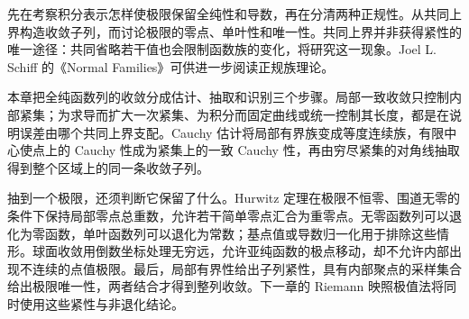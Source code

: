 \ProseParagraphBreak

先在考察积分表示怎样使极限保留全纯性和导数，再在分清两种正规性。从共同上界构造收敛子列，而讨论极限的零点、单叶性和唯一性。共同上界并非获得紧性的唯一途径：共同省略若干值也会限制函数族的变化，将研究这一现象。Joel L. Schiff 的《Normal Families》\cite{Schiff1993Normal}可供进一步阅读正规族理论。






\begin{chaptersummary}
本章把全纯函数列的收敛分成估计、抽取和识别三个步骤。局部一致收敛只控制内部紧集；为求导而扩大一次紧集、为积分而固定曲线或统一控制其长度，都是在说明误差由哪个共同上界支配。Cauchy 估计将局部有界族变成等度连续族，有限中心使点上的 Cauchy 性成为紧集上的一致 Cauchy 性，再由穷尽紧集的对角线抽取得到整个区域上的同一条收敛子列。

\ProseParagraphBreak

抽到一个极限，还须判断它保留了什么。Hurwitz 定理在极限不恒零、围道无零的条件下保持局部零点总重数，允许若干简单零点汇合为重零点。无零函数列可以退化为零函数，单叶函数列可以退化为常数；基点值或导数归一化用于排除这些情形。球面收敛用倒数坐标处理无穷远，允许亚纯函数的极点移动，却不允许内部出现不连续的点值极限。最后，局部有界性给出子列紧性，具有内部聚点的采样集合给出极限唯一性，两者结合才得到整列收敛。下一章的 Riemann 映照极值法将同时使用这些紧性与非退化结论。
\end{chaptersummary}

\BookExercises

